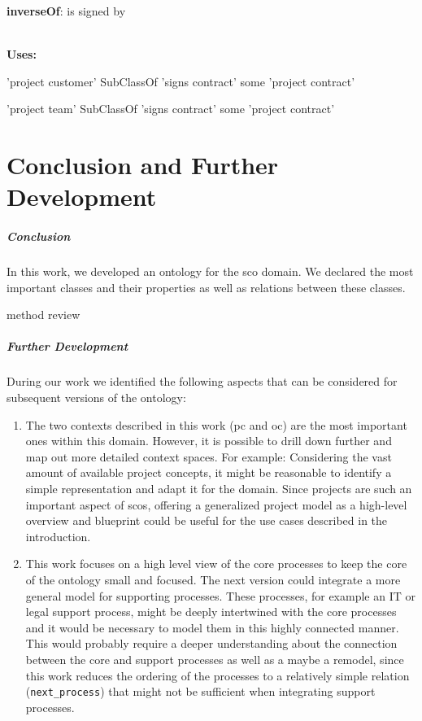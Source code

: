 \documentclass[a4paper, DIV=13, BCOR=0cm]{scrbook}
\newcommand{\relation}[1]{\texttt{#1}}
\begin{document}
\begin{mdframed}[style=onto, frametitle={signs contract}]
	{%
		\begin{compactitem}
			\item \textbf{inverseOf}: is signed by
		\end{compactitem}
		\hrulefill\\
		\textbf{Uses:}
		\begin{compactitem}
			\item 'project customer' SubClassOf 'signs contract' some 'project contract'
			\item 'project team' SubClassOf 'signs contract' some 'project contract'
		\end{compactitem}
	} %
\end{mdframed}

\chapter{Conclusion and Further Development}
\paragraph{Conclusion}
In this work, we developed an ontology for the \gls{sco} domain. We declared the most important classes and their properties as well as relations between these classes.

method review

\paragraph{Further Development}
During our work we identified the following aspects that can be considered for subsequent versions of the ontology:
\begin{enumerate}
	\item The two contexts described in this work (\gls{pc} and \gls{oc}) are the most important ones within this domain. However, it is possible to drill down further and map out more detailed context spaces. For example: Considering the vast amount of available project concepts, it might be reasonable to identify a simple representation and adapt it for the domain. Since projects are such an important aspect of \glspl{sco}, offering a generalized project model as a high-level overview and blueprint could be useful for the use cases described in the introduction.
	\item This work focuses on a high level view of the core processes to keep the core of the ontology small and focused. The next version could integrate a more general model for supporting processes. These processes, for example an IT or legal support process, might be deeply intertwined with the core processes and it would be necessary to model them in this highly connected manner. This would probably require a deeper understanding about the connection between the core and support processes as well as a maybe a remodel, since this work reduces the ordering of the processes to a relatively simple relation (\relation{next\_process}) that might not be sufficient when integrating support processes.
\end{enumerate}
 
\end{document}
